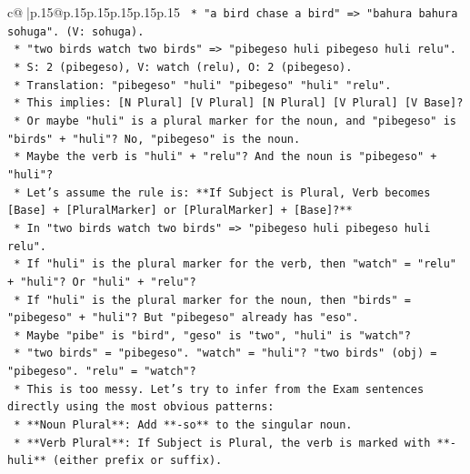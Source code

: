 \documentclass{article}
\begin{document}
{\begin{supertabular}{c@{$\;$}|p{.15\linewidth}@{}p{.15\linewidth}p{.15\linewidth}p{.15\linewidth}p{.15\linewidth}p{.15\linewidth}}
{{{\texttt{                        *   "a bird chase a bird" => "bahura bahura sohuga". (V: sohuga).} \\
\texttt{                        *   "two birds watch two birds" => "pibegeso huli pibegeso huli relu".} \\
\texttt{                            *   S: 2 (pibegeso), V: watch (relu), O: 2 (pibegeso).} \\
\texttt{                            *   Translation: "pibegeso" "huli" "pibegeso" "huli" "relu".} \\
\texttt{                            *   This implies: {[}N Plural{]} {[}V Plural{]} {[}N Plural{]} {[}V Plural{]} {[}V Base{]}?} \\
\texttt{                            *   Or maybe "huli" is a plural marker for the noun, and "pibegeso" is "birds" + "huli"? No, "pibegeso" is the noun.} \\
\texttt{                            *   Maybe the verb is "huli" + "relu"? And the noun is "pibegeso" + "huli"?} \\
\texttt{                            *   Let's assume the rule is: **If Subject is Plural, Verb becomes {[}Base{]} + {[}PluralMarker{]} or {[}PluralMarker{]} + {[}Base{]}?**} \\
\texttt{                            *   In "two birds watch two birds" => "pibegeso huli pibegeso huli relu".} \\
\texttt{                                *   If "huli" is the plural marker for the verb, then "watch" = "relu" + "huli"? Or "huli" + "relu"?} \\
\texttt{                                *   If "huli" is the plural marker for the noun, then "birds" = "pibegeso" + "huli"? But "pibegeso" already has "eso".} \\
\texttt{                                *   Maybe "pibe" is "bird", "geso" is "two", "huli" is "watch"?} \\
\texttt{                                *   "two birds" = "pibegeso". "watch" = "huli"? "two birds" (obj) = "pibegeso". "relu" = "watch"?} \\
\texttt{                                *   This is too messy. Let's try to infer from the Exam sentences directly using the most obvious patterns:} \\
\texttt{                                    *   **Noun Plural**: Add **{-}so** to the singular noun.} \\
\texttt{                                    *   **Verb Plural**: If Subject is Plural, the verb is marked with **{-}huli** (either prefix or suffix).} \\
}}}
\end{supertabular}}
\end{document}
